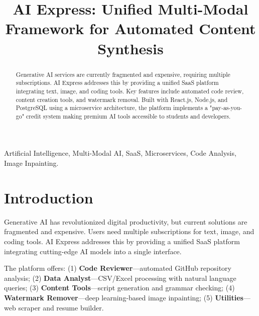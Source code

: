\documentclass[conference]{IEEEtran}
\begin{document}
\title{AI Express: Unified Multi-Modal Framework for Automated Content Synthesis}

\author{
}

\maketitle

\begin{abstract}
Generative AI services are currently fragmented and expensive, requiring multiple subscriptions. AI Express addresses this by providing a unified SaaS platform integrating text, image, and coding tools. Key features include automated code review, content creation tools, and watermark removal. Built with React.js, Node.js, and PostgreSQL using a microservice architecture, the platform implements a "pay-as-you-go" credit system making premium AI tools accessible to students and developers.
\end{abstract}

\begin{IEEEkeywords}
Artificial Intelligence, Multi-Modal AI, SaaS, Microservices, Code Analysis, Image Inpainting.
\end{IEEEkeywords}

\section{Introduction}
Generative AI has revolutionized digital productivity, but current solutions are fragmented and expensive. Users need multiple subscriptions for text, image, and coding tools. AI Express addresses this by providing a unified SaaS platform integrating cutting-edge AI models into a single interface.

The platform offers: (1) \textbf{Code Reviewer}---automated GitHub repository analysis; (2) \textbf{Data Analyst}---CSV/Excel processing with natural language queries; (3) \textbf{Content Tools}---script generation and grammar checking; (4) \textbf{Watermark Remover}---deep learning-based image inpainting; (5) \textbf{Utilities}---web scraper and resume builder.
\end{document}
